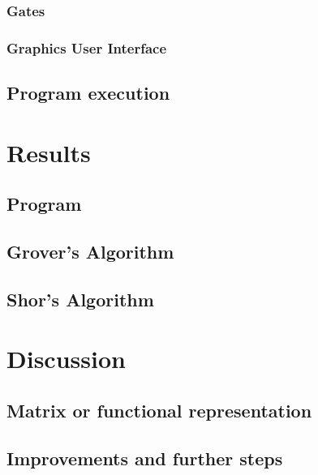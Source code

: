 \documentclass[bibliography=totocnumbered]{article}
\theoremstyle{NoticeStyle}
\begin{document}
\subsubsection{Gates}

\subsubsection{Graphics User Interface}

\subsection{Program execution}

%
\section{Results}

\subsection{Program}

\subsection{Grover's Algorithm}

\subsection{Shor's Algorithm}


%
\section{Discussion}

\subsection{Matrix or functional representation}

\subsection{Improvements and further steps}
\end{document}
